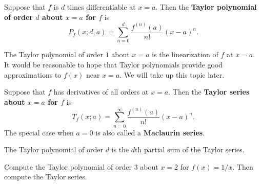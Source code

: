 

\begin{definition}
Suppose that $f$ is $d$ times differentiable at $x=a$.
Then the \textbf{Taylor polynomial of order $d$ about $x=a$ for $f$} is
\begin{equation*}
P_f(x; d, a) = \sum_{n=0}^d\frac{f^{(n)}(a)}{n!}(x-a)^n.
\end{equation*}
\end{definition}
\begin{remark}
The Taylor polynomial of order $1$ about $x=a$ is the linearization of $f$ at $x=a$.
It would be reasonable to hope that Taylor polynomials provide good approximations to $f(x)$ near $x=a$.
We will take up this topic later.
\end{remark}

\vfill 

\begin{definition}
Suppose that $f$ has derivatives of all orders at $x=a$.
Then the \textbf{Taylor series about $x=a$ for $f$} is
\begin{equation*}
T_f(x; a) = \sum_{n=0}^\infty \frac{f^{(n)}(a)}{n!}(x-a)^n.
\end{equation*}
The special case when $a=0$ is also called a \textbf{Maclaurin series}.
\end{definition}

\begin{remark}
The Taylor polynomial of order $d$ is the $d$th partial sum of the Taylor series.
\end{remark}

\vfill

\newpage

\begin{example}
Compute the Taylor polynomial of order $3$ about $x=2$ for $f(x) = 1/x$.
Then compute the Taylor series.
\end{example}

